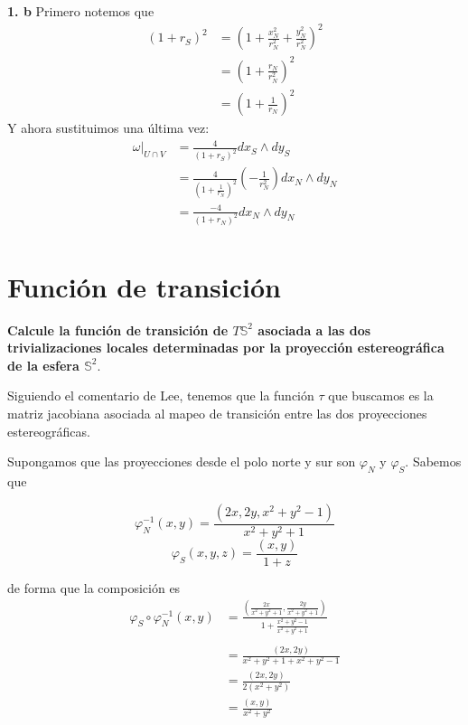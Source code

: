 \documentclass[11pt]{article}
\theoremstyle{definition}
\begin{document}
\textbf{1. b}
Primero notemos que
\begin{equation*}
    \begin{split}
        (1+r_S)^2&=\left(1+\frac{x_N^2}{r_N^2}+\frac{y^2_N}{r^2_N}\right)^2\\
        &=\left(1+\frac{r_N}{r_N^2}\right)^2\\
        &=\left(1+\frac{1}{r_N}\right)^2
    \end{split}
\end{equation*}
Y ahora sustituimos una última vez:
\begin{equation*}
    \begin{split}
        \omega|_{U\cap V}&=\frac{4}{(1+r_S)^2}dx_S\wedge dy_S\\
        &=\frac{4}{\left(1+\frac{1}{r_N}\right)^2}\left(-\frac{1}{r_N^2}\right)dx_N\wedge dy_N\\
        &=\frac{-4}{(1+r_N)^2}dx_N\wedge dy_N\\
    \end{split}
\end{equation*}

\newpage
\section*{Función de transición}
\textbf{Calcule la función de transición de $T\mathbb{S}^2$ asociada a las dos trivializaciones locales determinadas por la proyección estereográfica de la esfera $\mathbb{S}^2$}.\par
Siguiendo el comentario de Lee, tenemos que la función $\tau$ que buscamos es la matriz jacobiana asociada al mapeo de transición entre las dos proyecciones estereográficas.\par
Supongamos que las proyecciones desde el polo norte y sur son $\varphi_N$ y $\varphi_S$. Sabemos que

$$\varphi_N^{-1}(x,y)=\frac{(2x,2y,x^2+y^2-1)}{x^2+y^2+1}$$
$$\varphi_S(x,y,z)=\frac{(x,y)}{1+z}$$

de forma que la composición es
\begin{align*}    \varphi_S\circ\varphi_N^{-1}(x,y)&=\frac{(\frac{2x}{x^2+y^2+1},\frac{2y}{x^2+y^2+1})}{1+\frac{x^2+y^2-1}{x^2+y^2+1}}\\ \\
&=\frac{(2x,2y)}{x^2+y^2+1+x^2+y^2-1}\\
&=\frac{(2x,2y)}{2(x^2+y^2)}\\
&=\frac{(x,y)}{x^2+y^2}
\end{align*}
\end{document}
